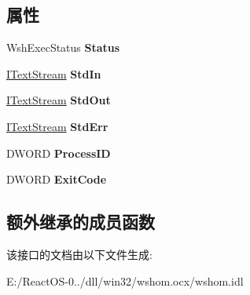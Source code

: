 \subsection*{属性}
\begin{DoxyCompactItemize}
\item 
\mbox{\label{interface_i_wsh_runtime_library_1_1_i_wsh_exec_a7285c5897c2d349398bd760e6b0996d9}} 
Wsh\+Exec\+Status {\bfseries Status}
\item 
\mbox{\label{interface_i_wsh_runtime_library_1_1_i_wsh_exec_a53ad28622b0346023ad40db62fd4b3e5}} 
\hyperlink{interface_i_wsh_runtime_library_1_1_i_text_stream}{I\+Text\+Stream} {\bfseries Std\+In}
\item 
\mbox{\label{interface_i_wsh_runtime_library_1_1_i_wsh_exec_a8f40b4340344f1d32f052e0e96616186}} 
\hyperlink{interface_i_wsh_runtime_library_1_1_i_text_stream}{I\+Text\+Stream} {\bfseries Std\+Out}
\item 
\mbox{\label{interface_i_wsh_runtime_library_1_1_i_wsh_exec_a935181fe0c539319fdd359c61faa2dc3}} 
\hyperlink{interface_i_wsh_runtime_library_1_1_i_text_stream}{I\+Text\+Stream} {\bfseries Std\+Err}
\item 
\mbox{\label{interface_i_wsh_runtime_library_1_1_i_wsh_exec_a890337cba70434e5ad429eb6aee37a3d}} 
D\+W\+O\+RD {\bfseries Process\+ID}
\item 
\mbox{\label{interface_i_wsh_runtime_library_1_1_i_wsh_exec_ab8c96c582d66a691924ac402154ecd74}} 
D\+W\+O\+RD {\bfseries Exit\+Code}
\end{DoxyCompactItemize}
\subsection*{额外继承的成员函数}


该接口的文档由以下文件生成\+:\begin{DoxyCompactItemize}
\item 
E\+:/\+React\+O\+S-\/0../dll/win32/wshom.\+ocx/wshom.\+idl\end{DoxyCompactItemize}
